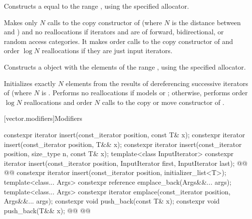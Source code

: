 \documentclass{wg21}
\begin{document}
\begin{itemdescr}

    \pnum
    \effects
    Constructs a  equal to the
    range , using the specified allocator.

    \pnum
    \complexity
    Makes only $N$
    calls to the copy constructor of
    (where $N$
    is the distance between
    and
    )
    and no reallocations if iterators  and  are of forward, bidirectional, or random access categories.
    It makes order
    calls to the copy constructor of
    and order
    $\log N$
    reallocations if they are just input iterators.
\end{itemdescr}

\begin{addedblock}
\begin{itemdecl}
template<@<T>@ R>}
vector(from_range_t, R&& rg, const Allocator& = Allocator());
\end{itemdecl}

\begin{itemdescr}
    \pnum
    \effects
    Constructs a  object with the elements of the range , using the specified allocator.

    \pnum
   \complexity
   Initializes exactly $N$ elements from the results of dereferencing
   successive iterators of 
   (where $N$ is .
   Performs no reallocations if 
   models  or ;
   otherwise, performs order $\log N$ reallocations and
   order $N$ calls to the copy or move constructor of .
\end{itemdescr}
\end{addedblock}

[vector.modifiers]{Modifiers}

%
\begin{itemdecl}
    constexpr iterator insert(const_iterator position, const T& x);
    constexpr iterator insert(const_iterator position, T&& x);
    constexpr iterator insert(const_iterator position, size_type n, const T& x);
    template<class InputIterator>
    constexpr iterator insert(const_iterator position, InputIterator first, InputIterator last);
    @@
    @@
    constexpr iterator insert(const_iterator position, initializer_list<T>);
    template<class... Args> constexpr reference emplace_back(Args&&... args);
    template<class... Args> constexpr iterator emplace(const_iterator position, Args&&... args);
    constexpr void push_back(const T& x);
    constexpr void push_back(T&& x);
    @@
    @@
\end{itemdecl}
\end{document}
